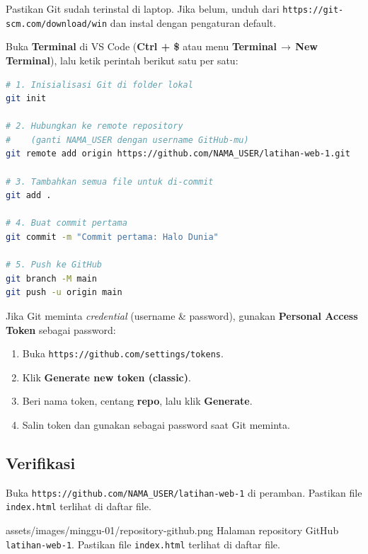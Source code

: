 \begin{peringatan}
Pastikan Git sudah terinstal di laptop. Jika belum, unduh dari \texttt{https://git-scm.com/download/win} dan instal dengan pengaturan default.
\end{peringatan}

Buka \textbf{Terminal} di VS Code (\textbf{Ctrl + \$} atau menu \textbf{Terminal\,$\rightarrow$\,New Terminal}), lalu ketik perintah berikut satu per satu:

\begin{lstlisting}[language=bash, caption={Perintah push pertama ke GitHub}, label={lst:m01-git-push}]
# 1. Inisialisasi Git di folder lokal
git init

# 2. Hubungkan ke remote repository
#    (ganti NAMA_USER dengan username GitHub-mu)
git remote add origin https://github.com/NAMA_USER/latihan-web-1.git

# 3. Tambahkan semua file untuk di-commit
git add .

# 4. Buat commit pertama
git commit -m "Commit pertama: Halo Dunia"

# 5. Push ke GitHub
git branch -M main
git push -u origin main
\end{lstlisting}

\begin{catatan}
Jika Git meminta \emph{credential} (username \& password), gunakan \textbf{Personal Access Token} sebagai password:
\begin{enumerate}
  \item Buka \texttt{https://github.com/settings/tokens}.
  \item Klik \textbf{Generate new token (classic)}.
  \item Beri nama token, centang \textbf{repo}, lalu klik \textbf{Generate}.
  \item Salin token dan gunakan sebagai password saat Git meminta.
\end{enumerate}
\end{catatan}

\subsection{Verifikasi}

Buka \texttt{https://github.com/NAMA\_USER/latihan-web-1} di peramban. Pastikan file \texttt{index.html} terlihat di daftar file.

\begin{tangkapanlayar}
  {assets/images/minggu-01/repository-github.png}
  {Halaman repository GitHub \texttt{latihan-web-1}.}
  {Pastikan file \texttt{index.html} terlihat di daftar file.}
\end{tangkapanlayar}

